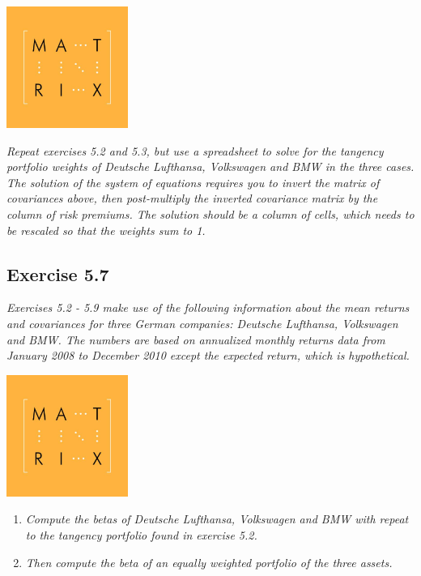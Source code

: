 \documentclass[]{book}
\theoremstyle{definition}
\theoremstyle{definition}
\theoremstyle{remark}
\begin{document}
\begin{center}\includegraphics[width=150px]{figures/matrix} \end{center}

\emph{Repeat exercises 5.2 and 5.3, but use a spreadsheet to solve for
the tangency portfolio weights of Deutsche Lufthansa, Volkswagen and BMW
in the three cases. The solution of the system of equations requires you
to invert the matrix of covariances above, then post-multiply the
inverted covariance matrix by the column of risk premiums. The solution
should be a column of cells, which needs to be rescaled so that the
weights sum to 1.} \citep[p.160]{book}

\subsection{Exercise 5.7}\label{exercise-5.7}

\emph{Exercises 5.2 - 5.9 make use of the following information about
the mean returns and covariances for three German companies: Deutsche
Lufthansa, Volkswagen and BMW. The numbers are based on annualized
monthly returns data from January 2008 to December 2010 except the
expected return, which is hypothetical.} \citep[p.159]{book}

\begin{center}\includegraphics[width=150px]{figures/matrix} \end{center}

\begin{enumerate}
\def\labelenumi{\alph{enumi}.}
\item
  \emph{Compute the betas of Deutsche Lufthansa, Volkswagen and BMW with
  repeat to the tangency portfolio found in exercise 5.2.}
  \citep[p.160]{book}
\item
  \emph{Then compute the beta of an equally weighted portfolio of the
  three assets.} \citep[p.160]{book}
\end{enumerate}
\end{document}
